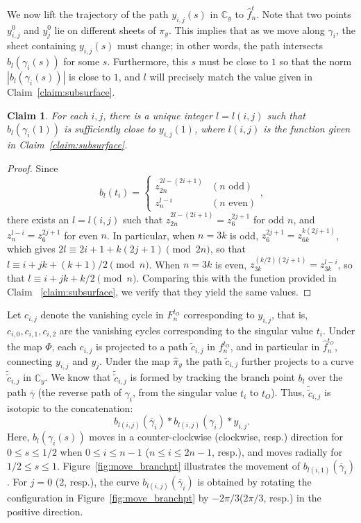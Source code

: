 \documentclass[10pt,a4paper,reqno]{amsart}
\newtheorem{claim}[thm]{Claim}
\theoremstyle{definition}
\numberwithin{equation}{section}
\numberwithin{figure}{section}
\newcommand{\C}{\mathbb{C}}
\begin{document}
We now lift the trajectory of the path $y_{i,j}(s)$ in $\C_y$ to $\hat{f}_n^t$.
Note that two points $y_{i,j}^0$ and $y_j^0$ lie on different sheets of $\pi_y$.
This implies that as we move along $\gamma_i$, the sheet containing $y_{i,j}(s)$ must change; in other words, 
the path intersects $b_l(\gamma_i(s))$ for some $s$. 
Furthermore, this $s$ must be close to $1$ so that the norm $|b_l(\gamma_i(s))|$ is close to $1$,
and $l$ will precisely match the value given in Claim~\ref{claim:subsurface}.

\begin{claim}
For each $i,j$, there is a unique integer $l=l(i,j)$ such that $b_l(\gamma_i(1))$ is sufficiently close to $y_{i,j}(1)$, where $l(i,j)$ is the function given in Claim~\ref{claim:subsurface}.
\end{claim}
\begin{proof}
Since
\[b_l(t_{i})=\begin{cases} z_{2n}^{2l-(2i+1)}& (n \text{ odd}) \\ z_n^{l-i} & (n \text{ even}) \end{cases},\] 
there exists an $l=l(i,j)$ such that $z_{2n}^{2l-(2i+1)} =z_6^{2j+1} $ for odd $n $, and $z_n^{l-i}=z_6^{2j+1}$ for even $n$.
In particular, when $n=3k$ is odd, $z_6^{2j+1}=z_{6k}^{k(2j+1)}$, which gives $2l \equiv 2i+1+k(2j+1) \pmod{2n}$, 
so that $l \equiv i+jk+(k+1)/2 \pmod{n}$.
When $n=3k$ is even, $z_{3k}^{(k/2)(2j+1)}=z_{3k}^{l-i}$, so that $l \equiv i+jk+k/2 \pmod{n}$. 
Comparing this with the function provided in Claim ~\ref{claim:subsurface}, we verify that they yield the same values.
\end{proof}

Let $c_{i,j}$ denote the vanishing cycle in ${F}_n^{t_O}$ corresponding to $y_{i,j}$, that is, $c_{i,0}, c_{i,1}, c_{i,2}$ are the vanishing cycles corresponding to the singular value $t_i$.
Under the map $\Phi$, each $c_{i,j}$ is projected to a path $\tilde{c}_{i,j}$ in $f_n^{t_O}$, and in particular in $\hat{f}_n^{t_O}$, connecting $y_{i,j}$ and $y_j$.
Under the map $\hat{\pi}_y$ the path $\tilde{c}_{i,j}$ further projects to a curve $\tilde{\tilde{c}}_{i,j}$ in $\C_y$.
We know that $\tilde{\tilde{c}}_{i,j}$ is formed by tracking the branch point $b_l$
over the path $\overline{\gamma}$ (the reverse path of $\gamma_i$, from the singular value $t_i$ to $t_O$).
Thus, $\tilde{\tilde{c}}_{i,j}$ is isotopic to the concatenation: 
\[b_{l(i,j)}(\overline{\gamma}_i) * b_{l(i,j)}(\gamma_i)* y_{i,j}.\]
Here, $b_l(\gamma_i(s))$ moves in a counter-clockwise (clockwise, resp.) direction for $0\le s \le 1/2$ when $0\le i \le n-1$ ($n\le i \le 2n-1$, resp.), and moves radially for $1/2\le s \le 1$.
Figure~\ref{fig:move_branchpt} illustrates the movement of $b_{l(i,1)}(\overline{\gamma}_i)$. 
For $j=0$ ($2$, resp.), the curve $b_{l(i,j)}(\overline{\gamma}_i)$ is obtained by rotating the configuration in Figure~\ref{fig:move_branchpt} by $-2\pi/3$($2\pi/3$, resp.) in the positive direction.
\end{document}
